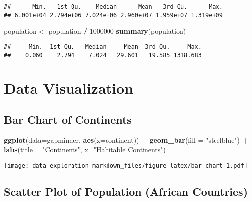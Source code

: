 \documentclass[
]{article}
\newenvironment{Shaded}{\begin{snugshade}}{\end{snugshade}}
\newcommand{\AttributeTok}[1]{\textcolor[rgb]{0.13,0.29,0.53}{#1}}
\newcommand{\DecValTok}[1]{\textcolor[rgb]{0.00,0.00,0.81}{#1}}
\newcommand{\FunctionTok}[1]{\textcolor[rgb]{0.13,0.29,0.53}{\textbf{#1}}}
\newcommand{\NormalTok}[1]{#1}
\newcommand{\OtherTok}[1]{\textcolor[rgb]{0.56,0.35,0.01}{#1}}
\newcommand{\SpecialCharTok}[1]{\textcolor[rgb]{0.81,0.36,0.00}{\textbf{#1}}}
\newcommand{\StringTok}[1]{\textcolor[rgb]{0.31,0.60,0.02}{#1}}
\begin{document}
\begin{verbatim}
##      Min.   1st Qu.    Median      Mean   3rd Qu.      Max. 
## 6.001e+04 2.794e+06 7.024e+06 2.960e+07 1.959e+07 1.319e+09
\end{verbatim}

\begin{Shaded}
\begin{Highlighting}[]
\NormalTok{population }\OtherTok{\textless{}{-}}\NormalTok{ population }\SpecialCharTok{/} \DecValTok{1000000}
\FunctionTok{summary}\NormalTok{(population) }
\end{Highlighting}
\end{Shaded}

\begin{verbatim}
##     Min.  1st Qu.   Median     Mean  3rd Qu.     Max. 
##    0.060    2.794    7.024   29.601   19.585 1318.683
\end{verbatim}

\section{Data Visualization}\label{data-visualization}

\subsection{Bar Chart of Continents}\label{bar-chart-of-continents}

\begin{Shaded}
\begin{Highlighting}[]
\FunctionTok{ggplot}\NormalTok{(}\AttributeTok{data=}\NormalTok{gapminder, }\FunctionTok{aes}\NormalTok{(}\AttributeTok{x=}\NormalTok{continent)) }\SpecialCharTok{+} 
  \FunctionTok{geom\_bar}\NormalTok{(}\AttributeTok{fill =} \StringTok{"steelblue"}\NormalTok{) }\SpecialCharTok{+} 
  \FunctionTok{labs}\NormalTok{(}\AttributeTok{title =} \StringTok{"Continents"}\NormalTok{, }\AttributeTok{x=}\StringTok{"Habitable Continents"}\NormalTok{)}
\end{Highlighting}
\end{Shaded}

\texttt{[image: data-exploration-markdown\_files/figure-latex/bar-chart-1.pdf]}

\subsection{Scatter Plot of Population (African
Countries)}\label{scatter-plot-of-population-african-countries}
\end{document}
